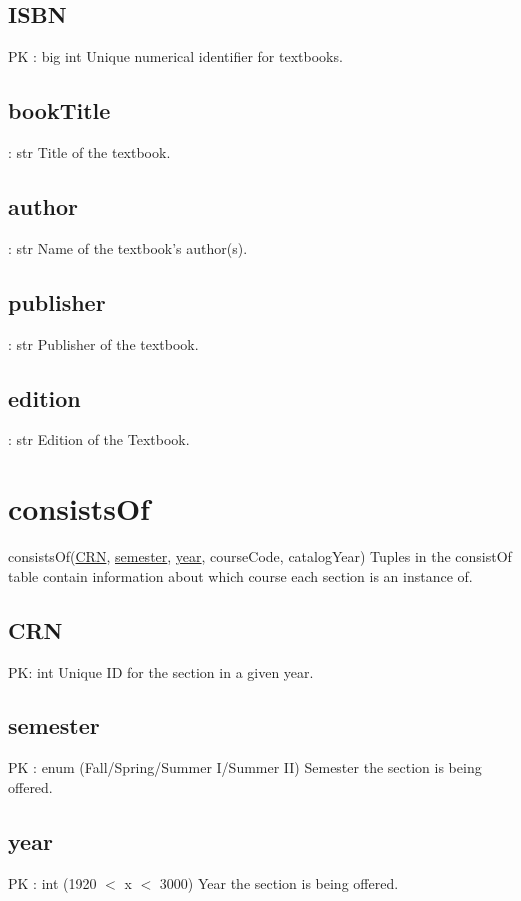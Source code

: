 	\subsection{ISBN}
		PK : big int
		Unique numerical identifier for textbooks.
	
	\subsection{bookTitle}
		: str 
		Title of the textbook.
	
	\subsection{author}
		: str 
		Name of the textbook's author(s).
	
	\subsection{publisher}
		: str 
		Publisher of the textbook.
	
	\subsection{edition}
		: str 
		Edition of the Textbook.


\section{consistsOf}
	consistsOf(\underline{CRN}, \underline{semester}, \underline{year}, courseCode, catalogYear) 
		Tuples in the consistOf table contain information about which course each section is an instance of.
	
	\subsection{CRN}
		PK: int 
		Unique ID for the section in a given year.

	\subsection{semester}
		PK : enum (Fall/Spring/Summer I/Summer II)
		Semester the section is being offered.
	
	\subsection{year}
		PK : int (1920 $<$ x $<$ 3000)
		Year the section is being offered.
	
